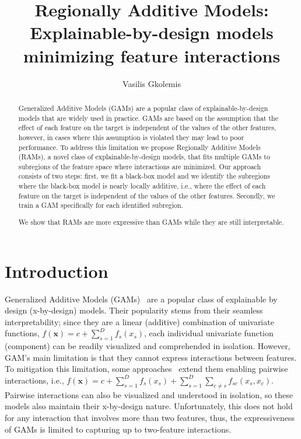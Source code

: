 \documentclass[12pt]{article}
\title{Regionally Additive Models: Explainable-by-design models minimizing feature interactions}
\author{Vasilis Gkolemis}
\newcommand{\xb}{\mathbf{x}}
\begin{document}
\maketitle

\begin{abstract}
Generalized Additive Models (GAMs) are a popular class of explainable-by-design models that are widely used in practice.
GAMs are based on the assumption that the effect of each feature on the target is independent of the values of the
other features, however, in cases where this assumption is violated they may lead to poor performance.
To address this limitation we propose Regionally Additive Models (RAMs), a novel class of explainable-by-design models,
that fits multiple GAMs to subregions of the feature space where interactions are minimized.
Our approach consists of two steps: first, we fit a black-box model and we identify the subregions where the black-box model is nearly locally additive,
i.e., where the effect of each feature on the target is independent of the values of the other features.
Secondly, we train a GAM specifically for each identified subregion.

We show that RAMs are more expressive than GAMs while they are still interpretable.

\end{abstract}

\section{Introduction}


Generalized Additive Models (GAMs)~\citep{hastie1987generalized} are a popular class of explainable by design (x-by-design) models.
Their popularity stems from their seamless interpretability; since they are a linear (additive) combination of univariate functions,
\(f(\xb) = c + \sum_{s=1}^D f_s(x_s)\), each individual univariate function (component) can be readily visualized and comprehended in isolation.
However, GAM's main limitation is that they cannot express interactions between features.
To mitigation this limitation, some approaches~\citep{lou2013accurate} extend them enabling pairwise interactions,
i.e., \(f(\xb) = c + \sum_{s=1}^D f_s(x_s) + \sum_{s=1}^D \sum_{c \neq s} f_{sc}(x_s, x_c)\).
Pairwise interactions can also be visualized and understood in isolation, so these models also maintain their x-by-design nature.
Unfortunately, this does not hold for any interaction that involves more than two features, thus, the expressiveness of GAMs is limited to capturing up to two-feature interactions.
\end{document}
